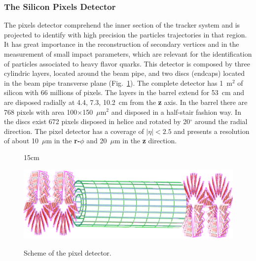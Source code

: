 \subsubsection{The Silicon Pixels Detector}
The pixels detector comprehend the inner section of the tracker system and is projected to identify with high precision the particles trajectories in that region. It has great importance in the reconstruction of secondary vertices and in the measurement of small impact parameters, which are relevant for the identification of particles associated to heavy flavor quarks. This detector is composed by three cylindric layers, located around the beam pipe, and two discs (endcaps) located in the beam pipe transverse plane (Fig.~\ref{fig:pixel_detector}). The complete detector has 1~m$^{2}$ of silicon with 66 millions of pixels. The layers in the barrel extend for 53~cm and are disposed radially at 4.4, 7.3, 10.2~cm from the \textbf{z} axis. In the barrel there are 768 pixels with area 100$\times$150~$\mu$m$^{2}$ and disposed in a half-stair fashion way. In the discs exist 672 pixels disposed in helice and rotated by 20$^{\circ}$ around the radial direction. The pixel detector has a coverage of $|\eta| < 2.5$ and presents a resolution of about 10~$\mu$m in the \textbf{r-$\phi$} and 20~$\mu$m in the \textbf{z} direction.

\begin{figure}[htbp]{15cm}
\caption{Scheme of the pixel detector.}
\includegraphics[scale=0.5]{ChapterCMS/figs/pixel_detector.png}
\label{fig:pixel_detector}
\end{figure}

